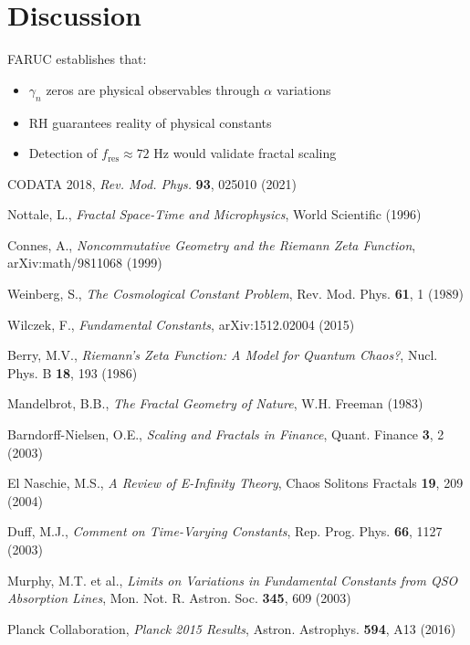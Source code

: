 \documentclass[a4paper, 12pt]{article}
\begin{document}
\section{Discussion}
FARUC establishes that:
\begin{itemize}
\item \(\gamma_n\) zeros are physical observables through \(\alpha\) variations
\item RH guarantees reality of physical constants
\item Detection of \(f_{\text{res}} \approx 72\) Hz would validate fractal scaling
\end{itemize}

\begin{thebibliography}{30}
CODATA 2018, \textit{Rev. Mod. Phys.} \textbf{93}, 025010 (2021)

Nottale, L., \textit{Fractal Space-Time and Microphysics}, World Scientific (1996)

Connes, A., \textit{Noncommutative Geometry and the Riemann Zeta Function}, arXiv:math/9811068 (1999)

Weinberg, S., \textit{The Cosmological Constant Problem}, Rev. Mod. Phys. \textbf{61}, 1 (1989)

Wilczek, F., \textit{Fundamental Constants}, arXiv:1512.02004 (2015)

Berry, M.V., \textit{Riemann's Zeta Function: A Model for Quantum Chaos?}, Nucl. Phys. B \textbf{18}, 193 (1986)

Mandelbrot, B.B., \textit{The Fractal Geometry of Nature}, W.H. Freeman (1983)

Barndorff-Nielsen, O.E., \textit{Scaling and Fractals in Finance}, Quant. Finance \textbf{3}, 2 (2003)

El Naschie, M.S., \textit{A Review of E-Infinity Theory}, Chaos Solitons Fractals \textbf{19}, 209 (2004)

Duff, M.J., \textit{Comment on Time-Varying Constants}, Rep. Prog. Phys. \textbf{66}, 1127 (2003)

Murphy, M.T. et al., \textit{Limits on Variations in Fundamental Constants from QSO Absorption Lines}, Mon. Not. R. Astron. Soc. \textbf{345}, 609 (2003)

Planck Collaboration, \textit{Planck 2015 Results}, Astron. Astrophys. \textbf{594}, A13 (2016)


\end{thebibliography}
\end{document}
